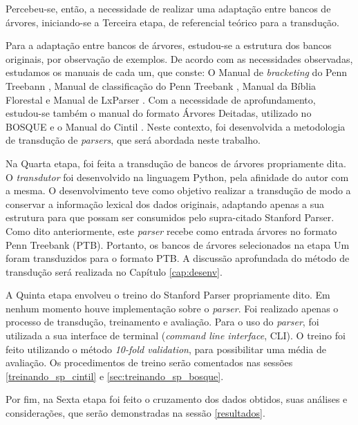 Percebeu-se, então, a necessidade de realizar uma adaptação entre bancos de árvores, iniciando-se a Terceira etapa, de referencial teórico para a transdução.

Para a adaptação entre bancos de árvores, estudou-se a estrutura dos bancos originais, por observação de exemplos. De acordo com as necessidades observadas, estudamos os manuais de cada um, que conste: O Manual de \textit{bracketing} do Penn Treebann \cite{bracketing_ptb}, Manual de classificação do Penn Treebank \cite{buildingPTB}, Manual da Bíblia Florestal \cite{freitas2007biblia} e Manual de LxParser \cite{siteLxParser}. Com a necessidade de aprofundamento, estudou-se também o manual do formato 
Árvores Deitadas, utilizado no BOSQUE \cite{afonso2006arvores} e o Manual do Cintil \cite{cintil_handbook}. Neste contexto, foi desenvolvida a metodologia de transdução de \textit{parsers}, que será abordada neste trabalho. 

Na Quarta etapa, foi feita a transdução de bancos de árvores propriamente dita. O \textit{transdutor} foi desenvolvido na linguagem Python, pela afinidade do autor com a mesma. O desenvolvimento teve como objetivo realizar a transdução de modo a conservar a informação lexical dos dados originais, adaptando apenas a sua estrutura para que possam ser consumidos pelo supra-citado Stanford Parser. Como dito anteriormente, este \textit{parser} recebe como entrada árvores no formato Penn Treebank (PTB). Portanto, os bancos de árvores selecionados na etapa Um foram transduzidos para o formato PTB.
A discussão aprofundada do método de transdução será realizada no Capítulo \ref{cap:desenv}.

A Quinta etapa envolveu o treino do Stanford Parser propriamente dito. Em nenhum momento houve implementação sobre o \textit{parser}. Foi realizado apenas o processo de transdução, treinamento e avaliação. Para o uso do \textit{parser}, foi utilizada a sua interface de terminal (\textit{command line interface}, CLI). O treino foi feito utilizando o método \textit{10-fold validation}, para possibilitar uma média de avaliação. Os procedimentos de treino serão comentados nas sessões \ref{treinando_sp_cintil} e \ref{sec:treinando_sp_bosque}.


Por fim, na Sexta etapa foi feito o cruzamento dos dados obtidos, suas análises e considerações, que serão demonstradas na sessão \ref{resultados}. 